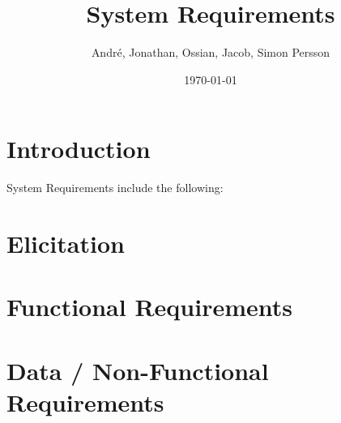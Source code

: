 \documentclass{article}
\title{System Requirements}
\author{André, Jonathan, Ossian, Jacob, Simon Persson}
\date{\today}
\begin{document}
\maketitle

\section{Introduction}
System Requirements include the following:

\section{Elicitation}


\section{Functional Requirements}


\section{Data / Non-Functional Requirements}

\end{document}
